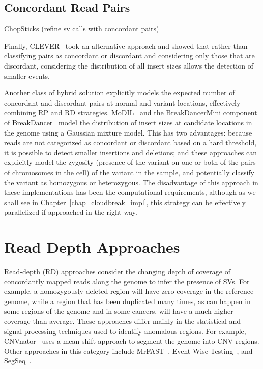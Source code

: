\subsection{Concordant Read Pairs}\label{section_mixture_of_distributions}

ChopSticks (refine sv calls with concordant pairs)~\cite{Yasuda:2012ij}

Finally, CLEVER~\cite{Marschall:2012ek} took an alternative approach and showed that rather than classifying pairs as concordant or discordant and considering only those that are discordant, considering the distribution of all insert sizes allows the detection of smaller events. 

Another class of hybrid solution explicitly models the expected number of concordant and discordant pairs at normal and variant locations, effectively combining RP and RD strategies. MoDIL~\cite{Lee:2009da} and the BreakDancerMini component of BreakDancer~\cite{Chen:2009p3} model the distribution of insert sizes at candidate locations in the genome using a Gaussian mixture model. This has two advantages: because reads are not categorized as concordant or discordant based on a hard threshold, it is possible to detect smaller insertions and deletions; and these approaches can explicitly model the zygosity (presence of the variant on one or both of the pairs of chromosomes in the cell) of the variant in the sample, and potentially classify the variant as homozygous or heterozygous. The disadvantage of this approach in these implementations has been the computational requirements, although as we shall see in Chapter~\ref{chap_cloudbreak_impl}, this strategy can be effectively parallelized if approached in the right way.


\section{Read Depth Approaches}

Read-depth (RD) approaches consider the changing depth of coverage of concordantly mapped reads along the genome to infer the presence of SVs. For example, a homozygously deleted region will have zero coverage in the reference genome, while a region that has been duplicated many times, as can happen in some regions of the genome and in some cancers, will have a much higher coverage than average. These approaches differ mainly in the statistical and signal processing techniques used to identify anomalous regions. For example, CNVnator~\cite{Abyzov:2011bk} uses a mean-shift approach to segment the genome into CNV regions. Other approaches in this category include MrFAST~\cite{Alkan:2009cr}, Event-Wise Testing~\cite{Yoon:2009kb}, and SegSeq~\cite{Chiang:2009di}.

